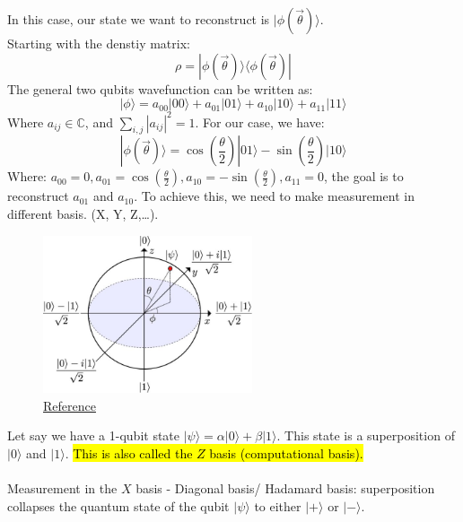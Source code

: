 \documentclass{article}
\begin{document}
In this case, our state we want to reconstruct is \(|\phi(\vec{\theta})\rangle\).
\\
Starting with the denstiy matrix:
\begin{equation*}
	\rho = |\phi(\vec{\theta})\rangle \langle \phi(\vec{\theta})|
\end{equation*}
The general two qubits wavefunction can be written as:
\begin{equation*}
	| \phi \rangle = a_{00} |00\rangle + a_{01} |01\rangle + a_{10} |10\rangle + a_{11} |11\rangle
\end{equation*}
Where \(a_{ij} \in \mathbb{C}\), and \(\sum_{i,j} |a_{ij}|^2 = 1\). For our case, we have:
\begin{equation*}
	| \phi(\vec{\theta}) \rangle = \cos\left(\frac{\theta}{2}\right) |01\rangle - \sin\left(\frac{\theta}{2}\right) |10\rangle
\end{equation*}
Where: \(a_{00} = 0, a_{01} =\cos\left(\frac{\theta}{2}\right) , a_{10} = -\sin\left(\frac{\theta}{2}\right), a_{11} = 0 \), the goal is to reconstruct
\(a_{01}\) and \(a_{10}\). To achieve this, we need to make measurement in different basis. (X, Y, Z,\dots).
\\
\begin{figure}[H]
	\centering
	\includegraphics[width=0.55\textwidth, height=0.4\textheight]{The-Bloch-sphere-representation-of-a-qubit-The-basis-states-are-located-at-the-north-and_W640.jpg}
	\caption{\href{https://www.researchgate.net/publication/284259345_Quantum_optics_with_artificial_atoms/figures?lo=1}{Reference}}
\end{figure}
\noindent Let say we have a 1-qubit state \(| \psi \rangle = \alpha |0\rangle + \beta |1\rangle\). This state is a superposition of \(|0\rangle\) and \(|1\rangle\).\hl{ This is also called the $Z$ basis (computational basis).} \\ \\
Measurement in the $X$ basis - Diagonal basis/ Hadamard basis: superposition collapses the quantum state of the qubit \(|\psi\rangle\) to either \(|+\rangle\) or \(|-\rangle\).
\end{document}
